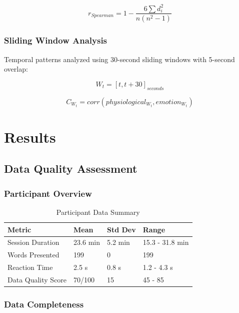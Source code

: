 \documentclass[12pt,a4paper]{article}
\begin{document}
\begin{equation}
r_{Spearman} = 1 - \frac{6 \sum d_i^2}{n(n^2 - 1)}
\end{equation}

\subsubsection{Sliding Window Analysis}

Temporal patterns analyzed using 30-second sliding windows with 5-second overlap:

\begin{equation}
W_t = [t, t + 30]_{seconds}
\end{equation}

\begin{equation}
C_{W_t} = corr(physiological_{W_t}, emotion_{W_t})
\end{equation}

\section{Results}

\subsection{Data Quality Assessment}

\subsubsection{Participant Overview}

\begin{table}[H]
\centering
\caption{Participant Data Summary}
\label{tab:participant_summary}
\begin{tabular}{@{}llll@{}}
\toprule
Metric & Mean & Std Dev & Range \\
\midrule
Session Duration & 23.6 min & 5.2 min & 15.3 - 31.8 min \\
Words Presented & 199 & 0 & 199 \\
Reaction Time & 2.5 s & 0.8 s & 1.2 - 4.3 s \\
Data Quality Score & 70/100 & 15 & 45 - 85 \\
\bottomrule
\end{tabular}
\end{table}

\subsubsection{Data Completeness}
\end{document}
